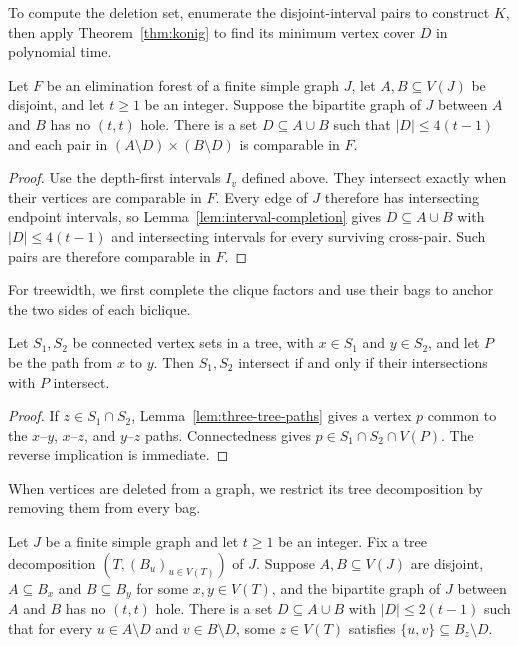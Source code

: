 To compute the deletion set, enumerate the disjoint-interval pairs
to construct $K$, then apply Theorem~\ref{thm:konig} to find its
minimum vertex cover $D$ in polynomial time.

\begin{lemma}\label{lem:sparse-biclique-completion}
Let $F$ be an elimination forest of a finite simple graph $J$,
let $A,B\subseteq V(J)$ be disjoint, and let $t\ge1$ be an integer.
Suppose the bipartite graph of $J$ between $A$ and $B$ has no
$(t,t)$ hole. There is a set $D\subseteq A\cup B$ such that
$|D|\leq4(t-1)$ and each pair in
$(A\setminus D)\times(B\setminus D)$ is comparable in $F$.
\end{lemma}

\begin{proof}
Use the depth-first intervals $I_v$ defined above. They intersect
exactly when their vertices are comparable in $F$.
Every edge of $J$ therefore has intersecting endpoint intervals, so
Lemma~\ref{lem:interval-completion} gives $D\subseteq A\cup B$ with
$|D|\le4(t-1)$ and intersecting intervals for every surviving
cross-pair. Such pairs are therefore comparable in $F$.
\end{proof}

For treewidth, we first complete the clique factors and use their
bags to anchor the two sides of each biclique.

\begin{lemma}
\label{lem:subtree-path-intersection}
Let $S_1,S_2$ be connected vertex sets in a tree, with $x\in S_1$
and $y\in S_2$, and let $P$ be the path from $x$ to $y$.
Then $S_1,S_2$ intersect if and only if their intersections with $P$
intersect.
\end{lemma}

\begin{proof}
If $z\in S_1\cap S_2$, Lemma~\ref{lem:three-tree-paths} gives a
vertex $p$ common to the $x$--$y$, $x$--$z$, and $y$--$z$ paths.
Connectedness gives
$p\in S_1\cap S_2\cap V(P)$. The reverse implication is immediate.
\end{proof}

When vertices are deleted from a graph, we restrict its tree
decomposition by removing them from every bag.

\begin{lemma}
\label{lem:tw-biclique-completion}
Let $J$ be a finite simple graph and let $t\ge1$ be an integer.
Fix a tree decomposition $(T,(B_u)_{u\in V(T)})$ of $J$.
Suppose $A,B\subseteq V(J)$ are disjoint, $A\subseteq B_x$ and
$B\subseteq B_y$ for some $x,y\in V(T)$, and the
bipartite graph of $J$ between $A$ and $B$ has no $(t,t)$ hole.
There is a set $D\subseteq A\cup B$ with
$|D|\leq2(t-1)$ such that
for every $u\in A\setminus D$ and $v\in B\setminus D$, some
$z\in V(T)$ satisfies $\{u,v\}\subseteq B_z\setminus D$.
\end{lemma}

